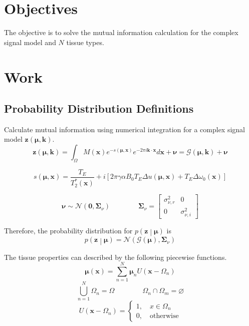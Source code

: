 \documentclass{article}         %
\theoremstyle{definition}
\theoremstyle{remark}
\newcommand{\eq}[1]{\begin{equation} #1 \end{equation}}
\newcommand{\xbf}{\mathbf{x}}
\newcommand{\zbf}{\mathbf{z}}
\newcommand{\mubf}{\boldsymbol{\mu}}
\newcommand{\nubf}{\boldsymbol{\nu}}
\newcommand{\Gscript}{\mathcal{G}}
\newcommand{\Nscript}{\mathcal{N}}
\newcommand{\paren}[1]{\left(#1\right)}
\newcommand{\arr}[2]{\begin{array}{#1} #2 \end{array}}
\newcommand{\sumnn}{\sum\limits_{n=1}^N}
\newcommand{\qq}{\qquad\qquad}
\begin{document}


\section{Objectives}\label{Objectives}

The objective is to solve the mutual information calculation for the complex signal model and $N$ tissue types.

\section{Work}\label{Work}

\subsection{Probability Distribution Definitions}\label{Probability Distribution Definitions}

Calculate mutual information using numerical integration for a complex signal model $\mathbf{z}\left(\mubf,\mathbf{k}\right)$.
\eq{\mathbf{z}\left(\mubf,\mathbf{k}\right) = \int_\Omega M\left(\mathbf{x}\right) e^{-s\left(\mubf ,\mathbf{x}\right)}e^{-2\pi i\mathbf{k}\cdot\mathbf{x}}d\mathbf{x}+\nubf=\mathcal{G}\left(\mubf,\mathbf{k}\right)+\nubf}

\eq{s\left(\mubf,\mathbf{x}\right)=\frac{T_E}{T_2^*\left(\mathbf{x}\right)}+i\left[2\pi\gamma\alpha B_0 T_E
\Delta u\left(\mubf,\mathbf{x}\right)+T_E\Delta\omega_0\left(\mathbf{x}\right)\right]}

\eq{\nubf\sim\mathcal{N}\left(\mathbf{0},\mathbf{\Sigma}_\nu\right) \qq \mathbf{\Sigma}_\nu = \left[ \begin{array}{cc} 
		\sigma_{\nu,r}^2 & 0 \\
		0 & \sigma_{\nu,i}^2 \end{array} \right]}

Therefore, the probability distribution for $p\paren{\zbf\middle|\mubf}$ is
\eq{p\paren{\zbf\middle|\mubf} = \Nscript\paren{\Gscript\paren{\mubf},\mathbf{\Sigma}_\nu}}

The tissue properties can described by the following piecewise functions.
\eq{\mubf\paren{\xbf} = \sumnn\mubf_nU\paren{\xbf-\Omega_n}}
\eq{\bigcup_{n=1}^N\Omega_n = \Omega \qq \Omega_n\cap\Omega_m = \varnothing}
\eq{U\paren{\xbf-\Omega_n} = \left\{\arr{l}{1, \quad x\in\Omega_n \\ 0, \quad \mathrm{otherwise}}\right.}
\end{document}
